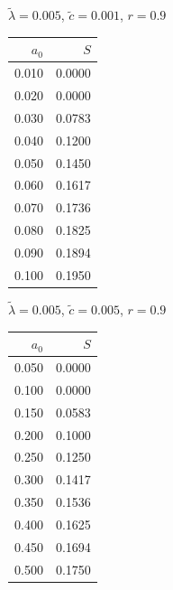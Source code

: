 \documentclass[11pt,a4paper]{article}
\begin{document}
\begin{minipage}[t]{\textwidth}
    \begin{minipage}[t]{0.32\textwidth}
        \footnotesize
        \begin{flushleft}$\tilde{\lambda}=0.005$, $\tilde{c}=0.001$, $r=0.9$\end{flushleft}
        \begin{tabular}[t]{rr}
            $a_0$ & $S$ \\
            \hline
             0.010 & 0.0000 \\
             0.020 & 0.0000 \\
             0.030 & 0.0783 \\
             0.040 & 0.1200 \\
             0.050 & 0.1450 \\
             0.060 & 0.1617 \\
             0.070 & 0.1736 \\
             0.080 & 0.1825 \\
             0.090 & 0.1894 \\
             0.100 & 0.1950 \\
        \end{tabular}
    \end{minipage}
    \begin{minipage}[t]{0.32\textwidth}
        \footnotesize
        \begin{flushleft}$\tilde{\lambda}=0.005$, $\tilde{c}=0.005$, $r=0.9$\end{flushleft}
        \begin{tabular}[t]{rr}
            $a_0$ & $S$ \\
            \hline
             0.050 & 0.0000 \\
             0.100 & 0.0000 \\
             0.150 & 0.0583 \\
             0.200 & 0.1000 \\
             0.250 & 0.1250 \\
             0.300 & 0.1417 \\
             0.350 & 0.1536 \\
             0.400 & 0.1625 \\
             0.450 & 0.1694 \\
             0.500 & 0.1750 \\
        \end{tabular}
    \end{minipage}
    \begin{minipage}[t]{0.32\textwidth}

\end{minipage}
\end{minipage}
\end{document}
